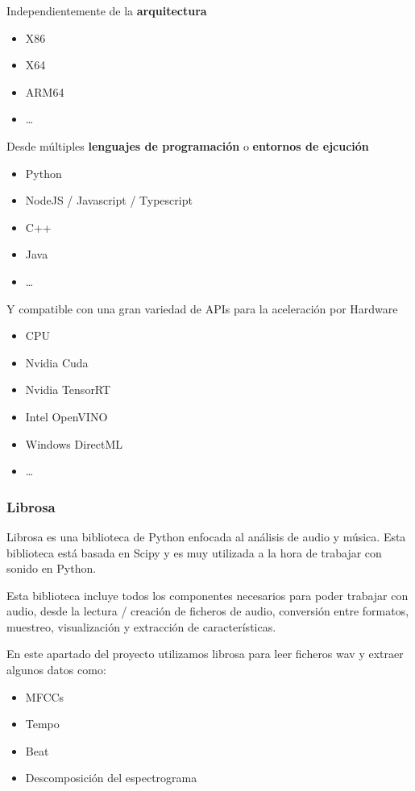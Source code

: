 Independientemente de la \textbf{arquitectura}

\begin{itemize}
\item
  X86
\item
  X64
\item
  ARM64
\item
  \ldots{}
\end{itemize}

Desde múltiples \textbf{lenguajes de programación} o \textbf{entornos de
ejcución}

\begin{itemize}
\item
  Python
\item
  NodeJS / Javascript / Typescript
\item
  C++
\item
  Java
\item
  \ldots{}
\end{itemize}

Y compatible con una gran variedad de APIs para la aceleración por
Hardware

\begin{itemize}
\item
  CPU
\item
  Nvidia Cuda
\item
  Nvidia TensorRT
\item
  Intel OpenVINO
\item
  Windows DirectML
\item
  \ldots{}
\end{itemize}

\hypertarget{librosa}{%
\subsubsection{Librosa}\label{librosa}}

Librosa es una biblioteca de Python enfocada al análisis de audio y
música. Esta biblioteca está basada en Scipy y es muy utilizada a la
hora de trabajar con sonido en Python.

Esta biblioteca incluye todos los componentes necesarios para poder
trabajar con audio, desde la lectura / creación de ficheros de audio,
conversión entre formatos, muestreo, visualización y extracción de
características.

En este apartado del proyecto utilizamos librosa para leer ficheros wav
y extraer algunos datos como:

\begin{itemize}
\item
  MFCCs
\item
  Tempo
\item
  Beat
\item
  Descomposición del espectrograma
\end{itemize}

